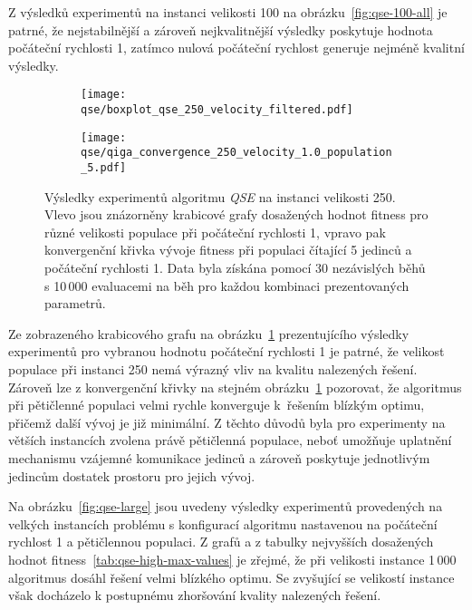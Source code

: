 Z výsledků experimentů na instanci velikosti 100 na obrázku~\ref{fig:qse-100-all} je patrné, že nejstabilnější a zároveň nejkvalitnější výsledky poskytuje hodnota počáteční rychlosti 1, zatímco nulová počáteční rychlost generuje nejméně kvalitní výsledky. 

\begin{figure}[ht!]
    \centering
    \begin{subfigure}[b]{0.45\textwidth}
      \texttt{[image: qse/boxplot\_qse\_250\_velocity\_filtered.pdf]}
    \end{subfigure}
    \hfill
    \begin{subfigure}[b]{0.48\textwidth}
        \texttt{[image: qse/qiga\_convergence\_250\_velocity\_1.0\_population\_5.pdf]}
    \end{subfigure}
    \caption{Výsledky experimentů algoritmu \emph{QSE} na instanci velikosti 250. Vlevo jsou znázorněny krabicové grafy dosažených hodnot fitness pro různé velikosti populace při počáteční rychlosti 1, vpravo pak konvergenční křivka vývoje fitness při populaci čítající 5 jedinců a počáteční rychlosti 1. Data byla získána pomocí 30 nezávislých běhů s 10\,000 evaluacemi na běh pro každou kombinaci prezentovaných parametrů.}
    \label{fig:qse-250-mix}
\end{figure}

Ze zobrazeného krabicového grafu na obrázku~\ref{fig:qse-250-mix} prezentujícího výsledky experimentů pro vybranou hodnotu počáteční rychlosti 1 je patrné, že velikost populace při instanci 250 nemá výrazný vliv na kvalitu nalezených řešení.
Zároveň lze z konvergenční křivky na stejném obrázku~\ref{fig:qse-250-mix} pozorovat, že algoritmus při pětičlenné populaci velmi rychle konverguje k~řešením blízkým optimu, přičemž další vývoj je již minimální. 
Z těchto důvodů byla pro experimenty na větších instancích zvolena právě pětičlenná populace, neboť umožňuje uplatnění mechanismu vzájemné komunikace jedinců a zároveň poskytuje jednotlivým jedincům dostatek prostoru pro jejich vývoj. 

Na obrázku~\ref{fig:qse-large} jsou uvedeny výsledky experimentů provedených na velkých instancích problému s konfigurací algoritmu nastavenou na počáteční rychlost 1 a pětičlennou populaci.
Z grafů a z tabulky nejvyšších dosažených hodnot fitness~\ref{tab:qse-high-max-values} je zřejmé, že při velikosti instance 1\,000 algoritmus dosáhl řešení velmi blízkého optimu. Se zvyšující se velikostí instance však docházelo k postupnému zhoršování kvality nalezených řešení.


